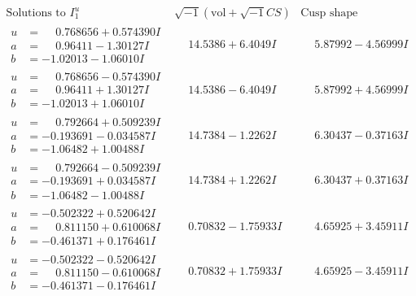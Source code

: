 \documentclass[1p]{elsarticle_modified}
\theoremstyle{definition}
\newcommand{\I}{\sqrt{-1}}
\begin{document}
$$\begin{array}{c|c|c}  
\text{Solutions to }I^u_{1}& \I (\text{vol} + \sqrt{-1}CS) & \text{Cusp shape}\\
 \hline 
\begin{aligned}
u &= \phantom{-}0.768656 + 0.574390 I \\
a &= \phantom{-}0.96411 - 1.30127 I \\
b &= -1.02013 - 1.06010 I\end{aligned}
 & \phantom{-}14.5386 + 6.4049 I & \phantom{-}5.87992 - 4.56999 I \\ \hline\begin{aligned}
u &= \phantom{-}0.768656 - 0.574390 I \\
a &= \phantom{-}0.96411 + 1.30127 I \\
b &= -1.02013 + 1.06010 I\end{aligned}
 & \phantom{-}14.5386 - 6.4049 I & \phantom{-}5.87992 + 4.56999 I \\ \hline\begin{aligned}
u &= \phantom{-}0.792664 + 0.509239 I \\
a &= -0.193691 - 0.034587 I \\
b &= -1.06482 + 1.00488 I\end{aligned}
 & \phantom{-}14.7384 - 1.2262 I & \phantom{-}6.30437 - 0.37163 I \\ \hline\begin{aligned}
u &= \phantom{-}0.792664 - 0.509239 I \\
a &= -0.193691 + 0.034587 I \\
b &= -1.06482 - 1.00488 I\end{aligned}
 & \phantom{-}14.7384 + 1.2262 I & \phantom{-}6.30437 + 0.37163 I \\ \hline\begin{aligned}
u &= -0.502322 + 0.520642 I \\
a &= \phantom{-}0.811150 + 0.610068 I \\
b &= -0.461371 + 0.176461 I\end{aligned}
 & \phantom{-}0.70832 - 1.75933 I & \phantom{-}4.65925 + 3.45911 I \\ \hline\begin{aligned}
u &= -0.502322 - 0.520642 I \\
a &= \phantom{-}0.811150 - 0.610068 I \\
b &= -0.461371 - 0.176461 I\end{aligned}
 & \phantom{-}0.70832 + 1.75933 I & \phantom{-}4.65925 - 3.45911 I \\ \hline\begin{aligned}

\end{aligned}
\end{array}$$
\end{document}
